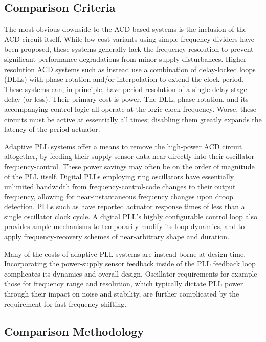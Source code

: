 \documentclass[twoside,9pt,journal,letterpage]{IEEEtran}
\begin{document}
\subsection{Comparison Criteria}

The most obvious downside to the ACD-based systems is the inclusion of the ACD circuit itself. While low-cost variants using simple frequency-dividers have been proposed, these systems generally lack the frequency resolution to prevent significant performance degradations from minor supply disturbances. Higher resolution ACD systems such as \cite{wilcox2015} instead use a combination of delay-locked loops (DLLs) with phase rotation and/or interpolation to extend the clock period. These systems can, in principle, have period resolution of a single delay-stage delay (or less). Their primary cost is power. The DLL, phase rotation, and its accompanying control logic all operate at the logic-clock frequency. Worse, these circuits must be active at essentially all times; disabling them greatly expands the latency of the period-actuator. 

Adaptive PLL systems offer a means to remove the high-power ACD circuit altogether, by feeding their supply-sensor data near-directly into their oscillator frequency-control. These power savings may often be on the order of magnitude of the PLL itself. Digital PLLs employing ring oscillators have essentially unlimited bandwidth from frequency-control-code changes to their output frequency, allowing for near-instantaneous frequency changes upon droop detection. PLLs such as \cite{hashimoto2018} have reported actuator response times of less than a single oscillator clock cycle. A digital PLL's highly configurable control loop also provides ample mechanisms to temporarily modify its loop dynamics, and to apply frequency-recovery schemes of near-arbitrary shape and duration. 

Many of the costs of adaptive PLL systems are instead borne at design-time. Incorporating the power-supply sensor feedback inside of the PLL feedback loop complicates its dynamics and overall design. Oscillator requirements for example those for frequency range and resolution, which typically dictate PLL power through their impact on noise and stability, are further complicated by the requirement for fast frequency shifting. 

\subsection{Comparison Methodology}
\end{document}
